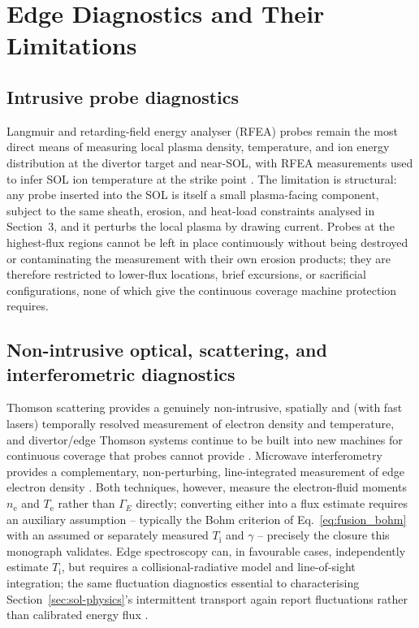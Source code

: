 \section{Edge Diagnostics and Their Limitations}

\subsection{Intrusive probe diagnostics}

Langmuir and retarding-field energy analyser (RFEA) probes remain the most direct means of measuring local plasma density, temperature, and ion energy distribution at the divertor target and near-SOL, with RFEA measurements used to infer SOL ion temperature at the strike point \cite{ref0610}. The limitation is structural: any probe inserted into the SOL is itself a small plasma-facing component, subject to the same sheath, erosion, and heat-load constraints analysed in Section~3, and it perturbs the local plasma by drawing current. Probes at the highest-flux regions cannot be left in place continuously without being destroyed or contaminating the measurement with their own erosion products; they are therefore restricted to lower-flux locations, brief excursions, or sacrificial configurations, none of which give the continuous coverage machine protection requires.

\subsection{Non-intrusive optical, scattering, and interferometric diagnostics}

Thomson scattering provides a genuinely non-intrusive, spatially and (with fast lasers) temporally resolved measurement of electron density and temperature, and divertor/edge Thomson systems continue to be built into new machines for continuous coverage that probes cannot provide \cite{ref0383}. Microwave interferometry provides a complementary, non-perturbing, line-integrated measurement of edge electron density \cite{ref0399}. Both techniques, however, measure the electron-fluid moments $n_{\mathrm{e}}$ and $T_{\mathrm{e}}$ rather than $\Gamma_{E}$ directly; converting either into a flux estimate requires an auxiliary assumption -- typically the Bohm criterion of Eq.~\eqref{eq:fusion_bohm} with an assumed or separately measured $T_{\mathrm{i}}$ and $\gamma$ -- precisely the closure this monograph validates. Edge spectroscopy can, in favourable cases, independently estimate $T_{\mathrm{i}}$, but requires a collisional-radiative model and line-of-sight integration; the same fluctuation diagnostics essential to characterising Section~\ref{sec:sol-physics}'s intermittent transport again report fluctuations rather than calibrated energy flux \cite{ref0611}.

